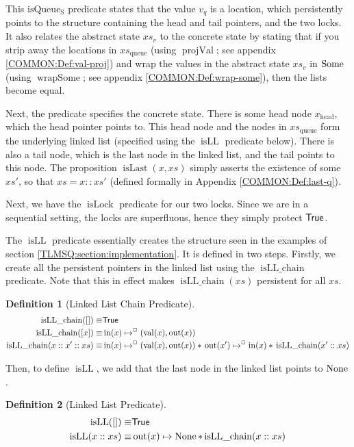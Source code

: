 \documentclass[a4paper, 10pt]{report}
\theoremstyle{definition}
\newtheorem{definition}{Definition}[section]
\newcommand{\isLock}{\operatorname{isLock}}
\newcommand{\isqueueseq}{\operatorname{isQueue_{S}}}
\newcommand{\vq}{v_q}
\newcommand{\xsc}{xs}
\newcommand{\xsqueue}{xs_{\mathrm{queue}}}
\newcommand{\isLLchain}{\operatorname{isLL\_chain}}
\newcommand{\isLL}{\operatorname{isLL}}
\newcommand{\projval}{\operatorname{projVal}}
\newcommand{\wrapsome}{\operatorname{wrapSome}}
\newcommand{\isLast}{\operatorname{isLast}}
\newcommand{\nIn}[1]{\operatorname{in}(#1)}
\newcommand{\nVal}[1]{\operatorname{val}(#1)}
\newcommand{\nOut}[1]{\operatorname{out}(#1)}
\newcommand{\node}{x}
\newcommand{\nodeN}[1]{\node_{\mathrm{#1}}}
\newcommand{\nodehead}{\nodeN{head}}
\newcommand{\absvalueList}{xs_v}
\newcommand{\isNode}[1]{\nIn{#1} \mapsto^{\persistently} (\nVal{#1}, \nOut{#1})}
\begin{document}
This $\isqueueseq$ predicate states that the value $\vq$ is a location, which persistently points to the structure containing the head and tail pointers, and the two locks. It also relates the abstract state $\absvalueList$ to the concrete state by stating that if you strip away the locations in $\xsqueue$ (using $\projval$; see appendix \ref{COMMON:Def:val-proj}) and wrap the values in the abstract state $\absvalueList$ in $\operatorname{Some}$ (using $\wrapsome$; see appendix \ref{COMMON:Def:wrap-some}), then the lists become equal.

Next, the predicate specifies the concrete state. There is some head node $\nodehead$, which the head pointer points to. This head node and the nodes in $\xsqueue$ form the underlying linked list (specified using the $\isLL$ predicate below). There is also a tail node, which is the last node in the linked list, and the tail points to this node. The proposition $\isLast(\node, \xsc)$ simply asserts the existence of some $\xsc'$, so that $\xsc = \node :: \xsc'$ (defined formally in Appendix \ref{COMMON:Def:last-q}).

Next, we have the $\isLock$ predicate for our two locks. Since we are in a sequential setting, the locks are superfluous, hence they simply protect $\textsf{True}$.

The $\isLL$ predicate essentially creates the structure seen in the examples of section \ref{TLMSQ:section:implementation}. It is defined in two steps. Firstly, we create all the persistent pointers in the linked list using the $\isLLchain$ predicate. Note that this in effect makes $\isLLchain(\xsc)$ persistent for all $\xsc$.
\begin{definition}[Linked List Chain Predicate]
  \begin{align*}
    \isLLchain([]) \equiv& \TRUE\\
    \isLLchain([\node]) \equiv& \isNode{\node}\\
    \isLLchain(\node :: \node' :: \xsc) \equiv& \isNode{\node} \star{} \nOut{\node'} \mapsto^{\persistently} \nIn{\node} \star{} \isLLchain(\node' :: \xsc)
  \end{align*}
\end{definition}

Then, to define $\isLL$, we add that the last node in the linked list points to $\operatorname{None}$.
\begin{definition}[Linked List Predicate]
  \begin{align*}
    \isLL([]) \equiv& \TRUE\\
    \isLL(\node :: \xsc) \equiv& \nOut{\node} \mapsto \None \star{} \isLLchain(\node :: \xsc)
  \end{align*}
\end{definition}
\end{document}
